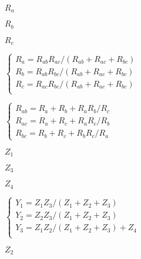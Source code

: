 \documentclass{article}
\def\lthtmlcheckvsize{\ifdim\ht\sizebox<\vsize 
  \ifdim\wd\sizebox<\hsize\expandafter\hfill\fi \expandafter\vfill
  \else\expandafter\vss\fi}%
\begin{document}
{\newpage\clearpage
{}%
$ R_a$%
\lthtmlindisplaymathZ
\lthtmlcheckvsize\clearpage}

{\newpage\clearpage
{}%
$ R_b$%
\lthtmlindisplaymathZ
\lthtmlcheckvsize\clearpage}

{\newpage\clearpage
{}%
$ R_c$%
\lthtmlindisplaymathZ
\lthtmlcheckvsize\clearpage}

{\newpage\clearpage
{}%
$\displaystyle \left\{ \begin{array}{rr}
R_a=R_{ab}R_{ac}/(R_{ab}+R_{ac}+R_{bc}) \\
R_b=R_{ab}R_{bc}/(R_{ab}+R_{ac}+R_{bc}) \\
R_c=R_{ac}R_{bc}/(R_{ab}+R_{ac}+R_{bc}) \\
\end{array} \right.$%
\lthtmlindisplaymathZ
\lthtmlcheckvsize\clearpage}

{\newpage\clearpage
{}%
$\displaystyle \left\{ \begin{array}{rr}
R_{ab}=R_a+R_b+R_aR_b/R_c	\\
R_{ac}=R_a+R_c+R_aR_c/R_b	\\
R_{bc}=R_b+R_c+R_bR_c/R_a	\end{array} \right.$%
\lthtmlindisplaymathZ
\lthtmlcheckvsize\clearpage}

{\newpage\clearpage
{}%
$ Z_1$%
\lthtmlindisplaymathZ
\lthtmlcheckvsize\clearpage}

{\newpage\clearpage
{}%
$ Z_3$%
\lthtmlindisplaymathZ
\lthtmlcheckvsize\clearpage}

{\newpage\clearpage
{}%
$ Z_4$%
\lthtmlindisplaymathZ
\lthtmlcheckvsize\clearpage}

{\newpage\clearpage
{}%
$\displaystyle \left\{ \begin{array}{l}
Y_1=Z_1Z_3/(Z_1+Z_2+Z_3) \\
Y_2=Z_2Z_3/(Z_1+Z_2+Z_3) \\
Y_3=Z_1Z_2/(Z_1+Z_2+Z_3)+Z_4 \\
\end{array} \right.$%
\lthtmlindisplaymathZ
\lthtmlcheckvsize\clearpage}

{\newpage\clearpage
{}%
$ Z_2$%
\lthtmlindisplaymathZ
\lthtmlcheckvsize\clearpage}
\end{document}
